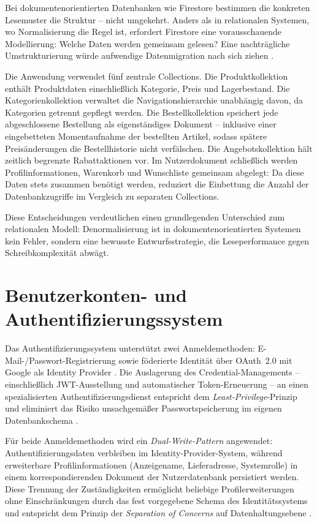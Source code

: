 Bei dokumentenorientierten Datenbanken wie Firestore bestimmen die konkreten Lesemuster die Struktur -- nicht umgekehrt. Anders als in relationalen Systemen, wo Normalisierung die Regel ist, erfordert Firestore eine vorausschauende Modellierung: Welche Daten werden gemeinsam gelesen? Eine nachträgliche Umstrukturierung würde aufwendige Datenmigration nach sich ziehen \cite{kesavan2023}.

Die Anwendung verwendet fünf zentrale Collections. Die Produktkollektion enthält Produktdaten einschließlich Kategorie, Preis und Lagerbestand. Die Kategorienkollektion verwaltet die Navigationshierarchie unabhängig davon, da Kategorien getrennt gepflegt werden. Die Bestellkollektion speichert jede abgeschlossene Bestellung als eigenständiges Dokument -- inklusive einer eingebetteten Momentaufnahme der bestellten Artikel, sodass spätere Preisänderungen die Bestellhistorie nicht verfälschen. Die Angebotskollektion hält zeitlich begrenzte Rabattaktionen vor. Im Nutzerdokument schließlich werden Profilinformationen, Warenkorb und Wunschliste gemeinsam abgelegt: Da diese Daten stets zusammen benötigt werden, reduziert die Einbettung die Anzahl der Datenbankzugriffe im Vergleich zu separaten Collections.

Diese Entscheidungen verdeutlichen einen grundlegenden Unterschied zum relationalen Modell: Denormalisierung ist in dokumentenorientierten Systemen kein Fehler, sondern eine bewusste Entwurfsstrategie, die Leseperformance gegen Schreibkomplexität abwägt.

\section{Benutzerkonten- und Authentifizierungssystem}
\label{sec:authentifizierung}

Das Authentifizierungssystem unterstützt zwei Anmeldemethoden: E-Mail-/Passwort-Registrierung sowie föderierte Identität über OAuth~2.0 mit Google als Identity Provider \cite{hardt2012}. Die Auslagerung des Credential-Managements -- einschließlich JWT-Ausstellung und automatischer Token-Erneuerung -- an einen spezialisierten Authentifizierungsdienst entspricht dem \textit{Least-Privilege}-Prinzip und eliminiert das Risiko unsachgemäßer Passwortspeicherung im eigenen Datenbankschema \cite{firebaseAuth2025, bucko2023}.

Für beide Anmeldemethoden wird ein \textit{Dual-Write-Pattern} angewendet: Authentifizierungsdaten verbleiben im Identity-Provider-System, während erweiterbare Profilinformationen (Anzeigename, Lieferadresse, Systemrolle) in einem korrespondierenden Dokument der Nutzerdatenbank persistiert werden. Diese Trennung der Zuständigkeiten ermöglicht beliebige Profilerweiterungen ohne Einschränkungen durch das fest vorgegebene Schema des Identitätssystems und entspricht dem Prinzip der \textit{Separation of Concerns} auf Datenhaltungsebene \cite{milojkovic2024}.

